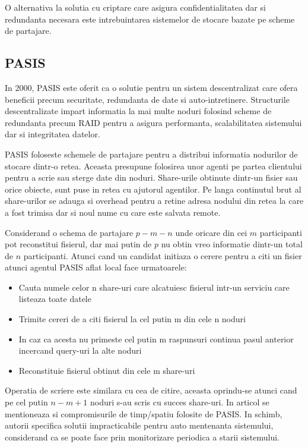 \documentclass{llncs}
\begin{document}
O alternativa la solutia cu criptare care asigura confidentialitatea dar si redundanta necesara este intrebuintarea sistemelor de stocare bazate pe scheme de partajare. \cite{W:2000,SB:2005,SGMV:2009}


\subsection{PASIS}
In 2000, PASIS este oferit ca o solutie pentru un sistem descentralizat care ofera beneficii precum securitate, redundanta de date si auto-intretinere.
Structurile descentralizate impart informatia la mai multe noduri folosind scheme de redundanta precum RAID pentru a asigura performanta, scalabilitatea sistemului dar si integritatea datelor. \cite{Patterson:1988}

PASIS foloseste schemele de partajare pentru a distribui informatia nodurilor de stocare dintr-o retea. Aceasta presupune folosirea unor agenti pe partea clientului pentru a scrie sau sterge date din noduri. Share-urile obtinute dintr-un fisier sau orice obiecte, sunt puse in retea cu ajutorul agentilor. Pe langa continutul brut al share-urilor se adauga si overhead pentru a retine adresa nodului din retea la care a fost trimisa dar si noul nume cu care este salvata remote.

Considerand o schema de partajare $p-m-n$ unde oricare din cei $m$ participanti pot reconstitui fisierul, dar mai putin de $p$ nu obtin vreo informatie dintr-un total de $n$ participanti. Atunci cand un candidat initiaza o cerere pentru a citi un fisier atunci agentul PASIS aflat local face urmatoarele: 
\begin{itemize}
	\item Cauta numele celor n share-uri care alcatuiesc fisierul intr-un serviciu care listeaza toate datele
	\item Trimite cereri de a citi fisierul la cel putin m din cele n noduri
	\item In caz ca acesta nu primeste cel putin m raspunsuri continua pasul anterior incercand query-uri la alte noduri
	\item Reconstituie fisierul obtinut din cele m share-uri
\end{itemize}
Operatia de scriere este similara cu cea de citire, aceasta oprindu-se atunci cand pe cel putin $n - m + 1$ noduri s-au scris cu succes share-uri.
In articol se mentioneaza si compromisurile de timp/spatiu folosite de PASIS. In schimb, autorii specifica solutii impracticabile pentru auto mentenanta sistemului, considerand ca se poate face prin monitorizare periodica a starii sistemului.
\end{document}
